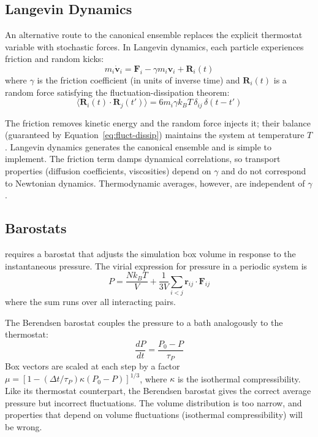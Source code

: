 \subsection{Langevin Dynamics}
\label{sec:langevin}

An alternative route to the canonical ensemble replaces the explicit thermostat variable with stochastic forces. In Langevin dynamics, each particle experiences friction and random kicks:
\begin{equation}
\label{eq:langevin}
m_i \dot{\mathbf{v}}_i = \mathbf{F}_i - \gamma m_i \mathbf{v}_i + \mathbf{R}_i(t)
\end{equation}
where $\gamma$ is the friction coefficient (in units of inverse time) and $\mathbf{R}_i(t)$ is a random force satisfying the fluctuation-dissipation theorem:
\begin{equation}
\label{eq:fluct-dissip}
\langle \mathbf{R}_i(t) \cdot \mathbf{R}_j(t') \rangle = 6 m_i \gamma k_B T \, \delta_{ij} \, \delta(t-t')
\end{equation}

The friction removes kinetic energy and the random force injects it; their balance (guaranteed by Equation~\ref{eq:fluct-dissip}) maintains the system at temperature $T$. Langevin dynamics generates the canonical ensemble and is simple to implement. The friction term damps dynamical correlations, so transport properties (diffusion coefficients, viscosities) depend on $\gamma$ and do not correspond to Newtonian dynamics. Thermodynamic averages, however, are independent of $\gamma$.

\subsection{Barostats}
\label{sec:barostats}

 requires a barostat that adjusts the simulation box volume in response to the instantaneous pressure. The virial expression for pressure in a periodic system is
\begin{equation}
\label{eq:virial-pressure}
P = \frac{Nk_BT}{V} + \frac{1}{3V}\sum_{i<j} \mathbf{r}_{ij} \cdot \mathbf{F}_{ij}
\end{equation}
where the sum runs over all interacting pairs.

The Berendsen barostat couples the pressure to a bath analogously to the thermostat:
\begin{equation}
\label{eq:berendsen-p}
\frac{dP}{dt} = \frac{P_0 - P}{\tau_P}
\end{equation}
Box vectors are scaled at each step by a factor $\mu = [1 - (\Delta t/\tau_P)\kappa(P_0 - P)]^{1/3}$, where $\kappa$ is the isothermal compressibility. Like its thermostat counterpart, the Berendsen barostat gives the correct average pressure but incorrect fluctuations. The volume distribution is too narrow, and properties that depend on volume fluctuations (isothermal compressibility) will be wrong.


